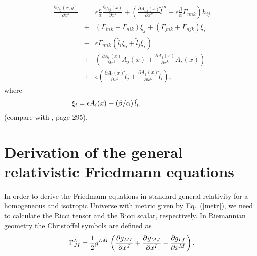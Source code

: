 \documentclass[aps,superscriptaddress, showpacs,preprintnumbers, superscriptaddress, nofootinbibt,twocolumn]{revtex4-2}
\begin{document}
\begin{eqnarray}
\frac{\partial \hat{g}_{ij}\left( x,y\right) }{\partial x^{k}}
&=&\epsilon \frac{F}{\alpha }\frac{\partial g_{ij}(x)}{\partial x^{k}}%
+\left( \frac{\partial A_{m}(x)}{\partial x^{k}}\tilde{l}^{m}-\epsilon
\frac{\beta }{\alpha }{\Gamma}_{nnk}\right) h_{ij} \nonumber\\
&+&\left( {\Gamma}_{ink}+{\Gamma}_{nik}\right) \xi_j
+ \left( {\Gamma}_{jnk}+{\Gamma}_{njk}\right)\xi_i
 \nonumber\\
&-&\epsilon{\Gamma}_{nnk}%
\left( \tilde{l}_{i}\xi_{j}+\tilde{l}%
_{j}\xi_{i}\right) %
 \nonumber\\
&+&\left( \frac{\partial A_{i}(x)}{\partial x^{k}}A_{j}(x)+\frac{\partial
A_{j}(x)}{\partial x^{k}}A_{i}(x)\right) \nonumber\\
&+&\epsilon \left( \frac{\partial
A_{i}(x)}{\partial x^{k}}\tilde{l}_{j}+\frac{\partial A_{j}(x)}{\partial
x^{k}}\tilde{l}_{i}\right) ,
\end{eqnarray}
where
\begin{equation}
\hspace{-2.5cm}\xi _{i}=\epsilon A_{i}(x)-\left( \beta /\alpha \right) \tilde{l}_{i},
\end{equation}
(compare with  \cite{Bao}, page 295).



\section{Derivation of the general relativistic Friedmann equations}\label{appb}

In order to derive the Friedmann equations in standard general relativity for a homogeneous and isotropic
Universe with metric given by Eq.~(\ref{metr}), we need to calculate the Ricci tensor and the Ricci scalar,
respectively. In Riemannian geometry the Christoffel symbols are defined as
\begin{equation}\label{Gamma for g}
\Gamma _{JI}^{L}=\frac{1}{2}g^{LM}\left( \frac{\partial g_{MI}}{\partial
x^{J}}+\frac{\partial g_{MJ}}{\partial x^{I}}-\frac{\partial g_{IJ}}{%
\partial x^{M}}\right) .
\end{equation}
\end{document}
